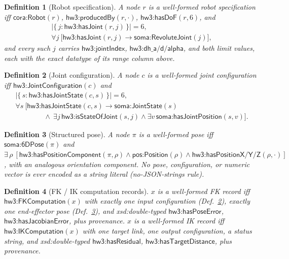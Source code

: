 \documentclass[11pt,a4paper]{article}
\newtheorem{definition}{Definition}[section]
\newcommand{\IRI}[1]{\textsf{#1}}                    %
\newcommand{\dbl}{\IRI{xsd{:}double}}
\begin{document}
\begin{definition}[Robot specification]\label{def:robot}
A node $r$ is a \emph{well-formed robot specification} iff
$\IRI{cora{:}Robot}(r)$, $\IRI{hw3{:}producedBy}(r,\cdot)$,
$\IRI{hw3{:}hasDoF}(r, 6)$, and
\begin{gather*}
  \bigl|\{\, j : \IRI{hw3{:}hasJoint}(r,j) \,\}\bigr| = 6, \\
  \forall j\ \bigl[\IRI{hw3{:}hasJoint}(r,j) \rightarrow \IRI{soma{:}RevoluteJoint}(j)\bigr],
\end{gather*}
and every such $j$ carries $\IRI{hw3{:}jointIndex}$,
$\IRI{hw3{:}dh\_a/d/alpha}$, and both limit values, each with the exact
datatype of its range column above.
\end{definition}

\begin{definition}[Joint configuration]\label{def:jc}
A node $c$ is a \emph{well-formed joint configuration} iff
$\IRI{hw3{:}JointConfiguration}(c)$ and
\begin{gather*}
  \bigl|\{\, s : \IRI{hw3{:}hasJointState}(c,s) \,\}\bigr| = 6, \\
  \forall s\ \bigl[\IRI{hw3{:}hasJointState}(c,s) \rightarrow
     \IRI{soma{:}JointState}(s) \\
  \qquad\qquad \wedge\ \exists j\, \IRI{hw3{:}isStateOfJoint}(s,j)
     \wedge \exists v\, \IRI{soma{:}hasJointPosition}(s,v) \bigr].
\end{gather*}
\end{definition}

\begin{definition}[Structured pose]\label{def:pose}
A node $\pi$ is a \emph{well-formed pose} iff $\IRI{soma{:}6DPose}(\pi)$ and
$\exists\, \rho\ [\IRI{hw3{:}hasPositionComponent}(\pi,\rho) \wedge
\IRI{pos{:}Position}(\rho) \wedge
\IRI{hw3{:}hasPositionX/Y/Z}(\rho,\cdot)]$, with an analogous orientation
component. No pose, configuration, or numeric vector is ever encoded as a
string literal (\emph{no-JSON-strings rule}).
\end{definition}

\begin{definition}[FK / IK computation records]\label{def:comp}
$x$ is a well-formed \emph{FK record} iff $\IRI{hw3{:}FKComputation}(x)$ with
exactly one input configuration (Def.~\ref{def:jc}), exactly one end-effector
pose (Def.~\ref{def:pose}), and \dbl-typed
$\IRI{hw3{:}hasPoseError}$, $\IRI{hw3{:}hasJacobianError}$, plus provenance.
$x$ is a well-formed \emph{IK record} iff $\IRI{hw3{:}IKComputation}(x)$ with
one target link, one output configuration, a status string, and \dbl-typed
$\IRI{hw3{:}hasResidual}$, $\IRI{hw3{:}hasTargetDistance}$, plus provenance.
\end{definition}
\end{document}
